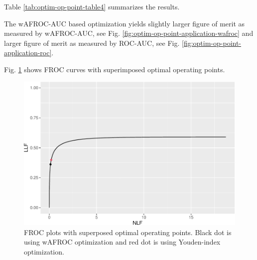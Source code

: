 \documentclass[
]{book}
\begin{document}
Table \ref{tab:optim-op-point-table4} summarizes the results.

\begin{table}[H]

\caption{\label{tab:optim-op-point-table4}Summary of optimization results for example FROC dataset. The wAFROC column always displays wAFROC-AUC, even though the optimized quantity may the Youden-index, as in the last four rows.}
\centering
{}
\end{table}

The wAFROC-AUC based optimization yields slightly larger figure of merit as measured by wAFROC-AUC, see Fig. \ref{fig:optim-op-point-application-wafroc} and larger figure of merit as measured by ROC-AUC, see Fig. \ref{fig:optim-op-point-application-roc}.

Fig. \ref{fig:optim-op-point-application-froc} shows FROC curves with superimposed optimal operating points.

\begin{figure}
\centering
\includegraphics{21-optim-op-point_files/figure-latex/optim-op-point-application-froc-1.pdf}
\caption{\label{fig:optim-op-point-application-froc}FROC plots with superposed optimal operating points. Black dot is using wAFROC optimization and red dot is using Youden-index optimization.}
\end{figure}
\end{document}
